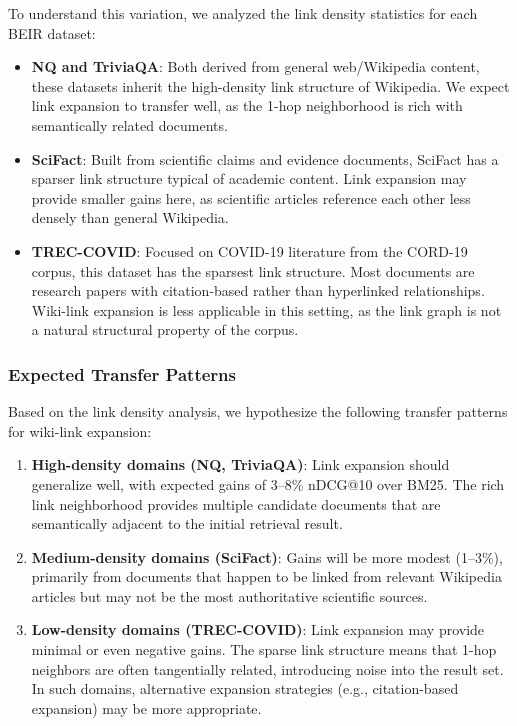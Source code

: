 \documentclass[sigconf,review]{acmart}
\begin{document}
To understand this variation, we analyzed the link density statistics for
each BEIR dataset:
\begin{itemize}[leftmargin=*,nosep]
\item \textbf{NQ and TriviaQA}: Both derived from general web/Wikipedia content,
      these datasets inherit the high-density link structure of Wikipedia.
      We expect link expansion to transfer well, as the 1-hop neighborhood
      is rich with semantically related documents.
\item \textbf{SciFact}: Built from scientific claims and evidence documents,
      SciFact has a sparser link structure typical of academic content.
      Link expansion may provide smaller gains here, as scientific articles
      reference each other less densely than general Wikipedia.
\item \textbf{TREC-COVID}: Focused on COVID-19 literature from the CORD-19
      corpus, this dataset has the sparsest link structure. Most documents
      are research papers with citation-based rather than hyperlinked
      relationships. Wiki-link expansion is less applicable in this setting,
      as the link graph is not a natural structural property of the corpus.
\end{itemize}

\subsubsection{Expected Transfer Patterns}
Based on the link density analysis, we hypothesize the following transfer
patterns for wiki-link expansion:

\begin{enumerate}[leftmargin=*,nosep]
\item \textbf{High-density domains (NQ, TriviaQA)}: Link expansion should
      generalize well, with expected gains of 3--8\% nDCG@10 over BM25.
      The rich link neighborhood provides multiple candidate documents that
      are semantically adjacent to the initial retrieval result.
\item \textbf{Medium-density domains (SciFact)}: Gains will be more modest
      (1--3\%), primarily from documents that happen to be linked from
      relevant Wikipedia articles but may not be the most authoritative
      scientific sources.
\item \textbf{Low-density domains (TREC-COVID)}: Link expansion may provide
      minimal or even negative gains. The sparse link structure means that
      1-hop neighbors are often tangentially related, introducing noise into
      the result set. In such domains, alternative expansion strategies
      (e.g., citation-based expansion) may be more appropriate.
\end{enumerate}
\end{document}
